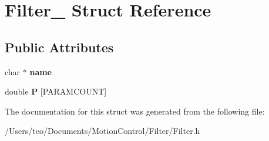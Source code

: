\hypertarget{struct_filter__}{}\section{Filter\+\_\+ Struct Reference}
\label{struct_filter__}
\subsection*{Public Attributes}
\begin{DoxyCompactItemize}
\item 
\mbox{\label{struct_filter___ab1adf12bb36ea90df91b0c91822da829}} 
char $\ast$ {\bfseries name}
\item 
\mbox{\label{struct_filter___a433b39c1f45e3f1af89f14f9eee6ae48}} 
double {\bfseries P} \mbox{[}P\+A\+R\+A\+M\+C\+O\+U\+NT\mbox{]}
\end{DoxyCompactItemize}


The documentation for this struct was generated from the following file\+:\begin{DoxyCompactItemize}
\item 
/\+Users/teo/\+Documents/\+Motion\+Control/\+Filter/Filter.\+h\end{DoxyCompactItemize}

